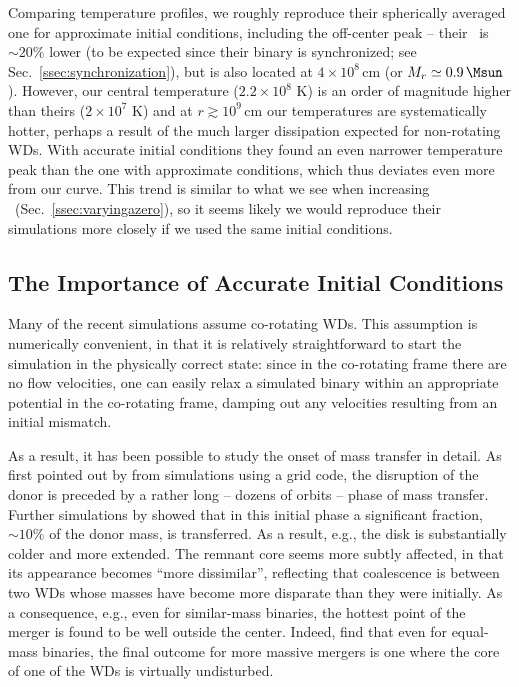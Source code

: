 Comparing temperature profiles, we roughly reproduce their spherically averaged one for approximate initial conditions, including the off-center peak -- their \Tmax\ is $\sim\!20\%$ lower (to be expected since their binary is synchronized; see Sec.~\ref{ssec:synchronization}), but is also located at $4\times10^8\,$cm (or $M_r\simeq0.9\,\Msun$).  However, our central temperature ($2.2\times10^8$ K) is an order of magnitude higher than theirs ($2\times10^7$ K) and at $r\gtrsim10^9\,$cm our temperatures are systematically hotter, perhaps a result of the much larger dissipation expected for non-rotating WDs.  With accurate initial conditions they found an even narrower temperature peak than the one with approximate conditions, which thus deviates even more from our curve.  This trend is similar to what we see when increasing \azero\ (Sec.~\ref{ssec:varyingazero}), so it seems likely we would reproduce their simulations more closely if we used the same initial conditions.

\subsection{The Importance of Accurate Initial Conditions}

Many of the recent simulations \citep{dan+11,dan+12,rask+12} assume co-rotating WDs.  This assumption is numerically convenient, in that it is relatively straightforward to start the simulation in the physically correct state: since in the co-rotating frame there are no flow velocities, one can easily relax a simulated binary within an appropriate potential in the co-rotating frame, damping out any velocities resulting from an initial mismatch.  

As a result, it has been possible to study the onset of mass transfer in detail.  As first pointed out by \citet{dsou+06} from simulations using a grid code, the disruption of the donor is preceded by a rather long -- dozens of orbits -- phase of mass transfer.  Further simulations by \cite{dan+11,dan+12} showed that in this initial phase a significant fraction, $\sim10\%$ of the donor mass, is transferred.  As a result, e.g., the disk is substantially colder and more extended.  The remnant core seems more subtly affected, in that its appearance becomes ``more dissimilar'', reflecting that coalescence is between two WDs whose masses have become more disparate than they were initially.  As a consequence, e.g., even for similar-mass binaries, the hottest point of the merger is found to be well outside the center.  Indeed, \citet{rask+12} find that even for equal-mass binaries, the final outcome for more massive mergers is one where the core of one of the WDs is virtually undisturbed.

